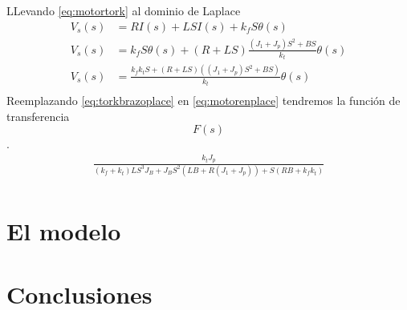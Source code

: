 \documentclass[a4paper]{IEEEtran} %
\begin{document}
LLevando \ref{eq:motortork} al dominio de Laplace 
\begin{equation}
    \begin{split}
        V_{s}(s)&=RI(s)+LSI(s)+k_{f}S\theta(s)\\
        V_{s}(s)&=k_{f}S\theta(s)+(R+LS)\frac{(J_{1}+J_{p})S^2+BS}{k_{t}}\theta(s)\\
        V_{s}(s)&=\frac{k_{f}k_{t}S+(R+LS)((J_{1}+J_{p})S^2+BS)}{k_{t}}\theta(s)\\
    \end{split}
    \label{eq:motorenplace}
\end{equation}
Reemplazando \ref{eq:torkbrazoplace} en \ref{eq:motorenplace} tendremos la función de transferencia$$F(s)$$.
\begin{equation}
    \begin{split}
        \frac{k_{t}J_{p}}{(k_{f}+k_{t})LS^3J_{B}+J_{B}S^2(LB+R(J_{1}+J_{p}))+S(RB+k_{f}k_{t})}\\
    \end{split}
    \label{eq:transfer}
\end{equation}

\section{El modelo}
\section{Conclusiones}



\end{document}

